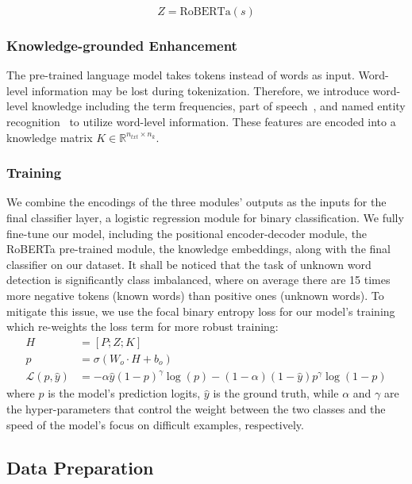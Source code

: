 \begin{equation}
Z = \textrm{RoBERTa}(s)
\end{equation}

\subsubsection{Knowledge-grounded Enhancement}
\label{sec:model_knowledge}
The pre-trained language model takes tokens instead of words as input. Word-level information may be lost during tokenization. Therefore, we introduce word-level knowledge including the term frequencies, part of speech~\cite{bird2009natural}, and named entity recognition~\cite{honnibal2020spacy} to utilize word-level information. These features are encoded into a knowledge matrix $K \in \mathbb{R}^{n_{txt} \times n_k}$.

\subsubsection{Training}
We combine the encodings of the three modules' outputs as the inputs for the final classifier layer, a logistic regression module for binary classification. We fully fine-tune our model, including the positional encoder-decoder module, the RoBERTa pre-trained module, the knowledge embeddings, along with the final classifier on our dataset. It shall be noticed that the task of unknown word detection is significantly class imbalanced, where on average there are 15 times more negative tokens (known words) than positive ones (unknown words). To mitigate this issue, we use the focal binary entropy loss for our model's training which re-weights the loss term for more robust training:
\begin{align}
    H &= [P; Z; K] \\
    p &= \sigma(W_o \cdot H+ b_o) \\
    \mathcal{L}(p, \hat{y}) &= - \alpha \hat{y} (1-p)^\gamma \log(p) - (1-\alpha) (1-\hat{y}) p^\gamma \log(1-p) 
\end{align}
where $p$ is the model's prediction logits, $\hat{y}$ is the ground truth, while $\alpha$ and $\gamma$ are the hyper-parameters that control the weight between the two classes and the speed of the model's focus on difficult examples, respectively.

\subsection{Data Preparation}
\label{sec:method_data_preparation}
